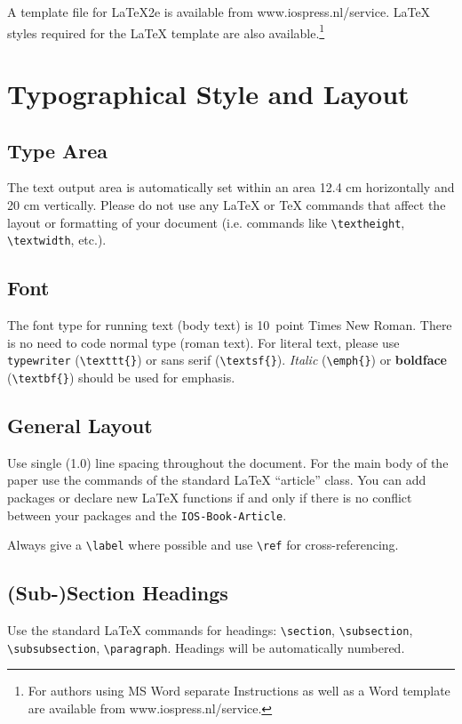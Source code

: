 \documentclass{IOS-Book-Article}
\begin{document}
A template file for \LaTeX2e is available from www.iospress.nl/service. \LaTeX{} styles required for the \LaTeX{} template are also
available.\footnote{For authors using MS Word separate Instructions as well
as a Word template are available from www.iospress.nl/service.}

\section{Typographical Style and Layout}

\subsection{Type Area}
The text output area is automatically set within an area 12.4 cm
horizontally and 20 cm vertically. Please do not use any
\LaTeX{} or \TeX{} commands that affect the layout or formatting of
your document (i.e. commands like \verb|\textheight|,
\verb|\textwidth|, etc.).



\subsection{Font}

The font type for running text (body text) is 10~point Times New Roman.
There is no need to code normal type (roman text). For literal text, please use
\texttt{type\-writer} (\verb|\texttt{}|)
or \textsf{sans serif} (\verb|\textsf{}|). \emph{Italic} (\verb|\emph{}|)
or \textbf{boldface} (\verb|\textbf{}|) should be used for emphasis.

\subsection{General Layout}
Use single (1.0) line spacing throughout the document. For the main
body of the paper use the commands of the standard \LaTeX{}
``article'' class. You can add packages or declare new \LaTeX{}
functions if and only if there is no conflict between your packages
and the \texttt{IOS-Book-Article}.

Always give a \verb|\label| where possible and use \verb|\ref| for cross-referencing.


\subsection{(Sub-)Section Headings}
Use the standard \LaTeX{} commands for headings: {\small \verb|\section|, \verb|\subsection|, \verb|\subsubsection|, \verb|\paragraph|}.
Headings will be automatically numbered.
\end{document}
